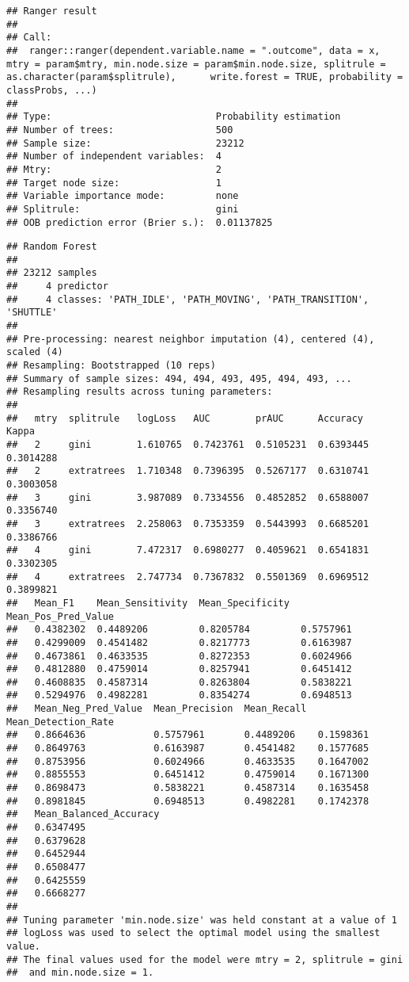 \documentclass[]{article}
\begin{document}
\begin{verbatim}
## Ranger result
## 
## Call:
##  ranger::ranger(dependent.variable.name = ".outcome", data = x,      mtry = param$mtry, min.node.size = param$min.node.size, splitrule = as.character(param$splitrule),      write.forest = TRUE, probability = classProbs, ...) 
## 
## Type:                             Probability estimation 
## Number of trees:                  500 
## Sample size:                      23212 
## Number of independent variables:  4 
## Mtry:                             2 
## Target node size:                 1 
## Variable importance mode:         none 
## Splitrule:                        gini 
## OOB prediction error (Brier s.):  0.01137825
\end{verbatim}

\begin{verbatim}
## Random Forest 
## 
## 23212 samples
##     4 predictor
##     4 classes: 'PATH_IDLE', 'PATH_MOVING', 'PATH_TRANSITION', 'SHUTTLE' 
## 
## Pre-processing: nearest neighbor imputation (4), centered (4), scaled (4) 
## Resampling: Bootstrapped (10 reps) 
## Summary of sample sizes: 494, 494, 493, 495, 494, 493, ... 
## Resampling results across tuning parameters:
## 
##   mtry  splitrule   logLoss   AUC        prAUC      Accuracy   Kappa    
##   2     gini        1.610765  0.7423761  0.5105231  0.6393445  0.3014288
##   2     extratrees  1.710348  0.7396395  0.5267177  0.6310741  0.3003058
##   3     gini        3.987089  0.7334556  0.4852852  0.6588007  0.3356740
##   3     extratrees  2.258063  0.7353359  0.5443993  0.6685201  0.3386766
##   4     gini        7.472317  0.6980277  0.4059621  0.6541831  0.3302305
##   4     extratrees  2.747734  0.7367832  0.5501369  0.6969512  0.3899821
##   Mean_F1    Mean_Sensitivity  Mean_Specificity  Mean_Pos_Pred_Value
##   0.4382302  0.4489206         0.8205784         0.5757961          
##   0.4299009  0.4541482         0.8217773         0.6163987          
##   0.4673861  0.4633535         0.8272353         0.6024966          
##   0.4812880  0.4759014         0.8257941         0.6451412          
##   0.4608835  0.4587314         0.8263804         0.5838221          
##   0.5294976  0.4982281         0.8354274         0.6948513          
##   Mean_Neg_Pred_Value  Mean_Precision  Mean_Recall  Mean_Detection_Rate
##   0.8664636            0.5757961       0.4489206    0.1598361          
##   0.8649763            0.6163987       0.4541482    0.1577685          
##   0.8753956            0.6024966       0.4633535    0.1647002          
##   0.8855553            0.6451412       0.4759014    0.1671300          
##   0.8698473            0.5838221       0.4587314    0.1635458          
##   0.8981845            0.6948513       0.4982281    0.1742378          
##   Mean_Balanced_Accuracy
##   0.6347495             
##   0.6379628             
##   0.6452944             
##   0.6508477             
##   0.6425559             
##   0.6668277             
## 
## Tuning parameter 'min.node.size' was held constant at a value of 1
## logLoss was used to select the optimal model using the smallest value.
## The final values used for the model were mtry = 2, splitrule = gini
##  and min.node.size = 1.
\end{verbatim}
\end{document}
